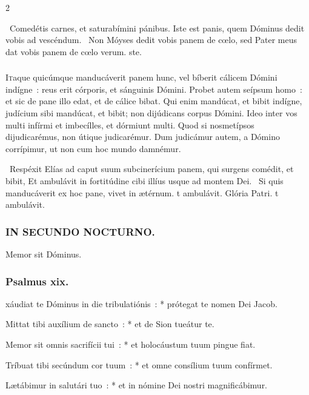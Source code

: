 \documentclass[9pt,twoside]{extarticle}
\begin{document}
\begin{multicols}{2}
{\begin{tightlist}{}
\item {}~Comedétis carnes, et saturabímini pánibus. \textred{*} Iste est panis, quem Dóminus dedit vobis ad vescéndum. ~Non Móyses dedit vobis panem de cœlo, sed Pater meus dat vobis panem de cœlo verum. ste.
\end{tightlist}

\subsubsection*{\center{}}
\lettrine{I}taque quicúmque manducáverit panem hunc, vel bíberit cálicem Dómini indígne~: reus erit córporis, et sánguinis Dómini. Probet autem seípsum homo~: et sic de pane illo edat, et de cálice bibat. Qui enim mandúcat, et bibit indígne, judícium sibi mandúcat, et bibit; non dijúdicans corpus Dómini. Ideo inter vos multi infírmi et imbecílles, et dórmiunt multi. Quod si nosmetípsos dijudicarémus, non útique judicarémur. Dum judicámur autem, a Dómino corrípimur, ut non cum hoc mundo damnémur.

\begin{tightlist}{}
\item {}~Respéxit Elías ad caput suum subcinerícium panem, qui surgens comédit, et bibit, \textred{*} Et ambulávit in fortitúdine cibi illíus usque ad montem Dei. ~Si quis manducáverit ex hoc pane, vivet in ætérnum. t ambulávit. Glória Patri. t ambulávit.
\end{tightlist}

\subsubsection*{\center \textsc{IN SECUNDO NOCTURNO.}}
 Memor sit Dóminus.
\subsubsection*{\center Psalmus xix.}
xáudiat te Dóminus in die tribulatiónis~: * prótegat te nomen Dei Jacob.

Mittat tibi auxílium de sancto~: * et de Sion tueátur te.

Memor sit omnis sacrifícii tui~: * et holocáustum tuum pingue fiat.

Tríbuat tibi secúndum cor tuum~: * et omne consílium tuum confírmet.

Lætábimur in salutári tuo~: * et in nómine Dei nostri magnificábimur.

}
\end{multicols}
\end{document}

